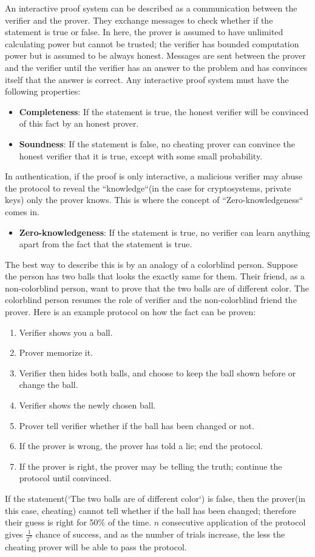 \documentclass{report}
\begin{document}
		An interactive proof system can be described as a communication between the verifier and the prover. They exchange messages to check whether if the statement is true or false. In here, the prover is assumed to have unlimited calculating power but cannot be trusted; the verifier has bounded computation power but is assumed to be always honest. Messages are sent between the prover and the verifier until the verifier has an answer to the problem and has convinces itself that the answer is correct.
		Any interactive proof system must have the following properties:
		\begin{itemize}
			\item \textbf{Completeness}: If the statement is true, the honest verifier will be convinced of this fact by an honest prover.
			\item \textbf{Soundness}: If the statement is false, no cheating prover can convince the honest verifier that it is true, except with some small probability.
		\end{itemize}
		In authentication, if the proof is only interactive, a malicious verifier may abuse the protocol to reveal the ``knowledge``(in the case for cryptosystems, private keys) only the prover knows. This is where the concept of ``Zero-knowledgeness`` comes in.
		\begin{itemize}
			\item \textbf{Zero-knowledgeness}: If the statement is true, no verifier can learn anything apart from the fact that the statement is true.
		\end{itemize}
		The best way to describe this is by an analogy of a colorblind person. Suppose the person has two balls that looks the exactly same for them. Their friend, as a non-colorblind person, want to prove that the two balls are of different color. The colorblind person resumes the role of verifier and the non-colorblind friend the prover. Here is an example protocol on how the fact can be proven:
		\begin{enumerate}
			\item Verifier shows you a ball.
			\item Prover memorize it.
			\item Verifier then hides both balls, and choose to keep the ball shown before or change the ball.
			\item Verifier shows the newly chosen ball.
			\item Prover tell verifier whether if the ball has been changed or not.
			\item If the prover is wrong, the prover has told a lie; end the protocol.
			\item If the prover is right, the prover may be telling the truth; continue the protocol until convinced.
		\end{enumerate}
		If the statement(`The two balls are of different color`) is false, then the prover(in this case, cheating) cannot tell whether if the ball has been changed; therefore their guess is right for 50\% of the time. $n$ consecutive application of the protocol gives $\frac{1}{2^n}$ chance of success, and as the number of trials increase, the less the cheating prover will be able to pass the protocol.
		
\end{document}
